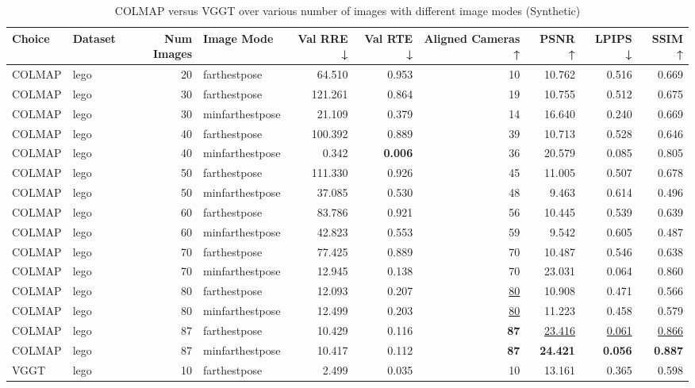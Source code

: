 \begin{table}[H]
\caption{\ifdefined\customcaption \customcaption \else COLMAP versus VGGT over various number of images with different image modes (Synthetic) \fi}
\label{tab:01_num_images_image_mode_synthetic}
\centering
\scriptsize
\begin{tabular}{llrlrrrrrr}
\toprule
Choice & Dataset & Num Images & Image Mode & Val RRE ↓ & Val RTE ↓ & Aligned Cameras ↑ & PSNR ↑ & LPIPS ↓ & SSIM ↑ \\
\midrule
COLMAP & lego & 20 & farthestpose & 64.510 & 0.953 & 10 & 10.762 & 0.516 & 0.669 \\
COLMAP & lego & 30 & farthestpose & 121.261 & 0.864 & 19 & 10.755 & 0.512 & 0.675 \\
COLMAP & lego & 30 & minfarthestpose & 21.109 & 0.379 & 14 & 16.640 & 0.240 & 0.669 \\
COLMAP & lego & 40 & farthestpose & 100.392 & 0.889 & 39 & 10.713 & 0.528 & 0.646 \\
COLMAP & lego & 40 & minfarthestpose & 0.342 & \textbf{0.006} & 36 & 20.579 & 0.085 & 0.805 \\
COLMAP & lego & 50 & farthestpose & 111.330 & 0.926 & 45 & 11.005 & 0.507 & 0.678 \\
COLMAP & lego & 50 & minfarthestpose & 37.085 & 0.530 & 48 & 9.463 & 0.614 & 0.496 \\
COLMAP & lego & 60 & farthestpose & 83.786 & 0.921 & 56 & 10.445 & 0.539 & 0.639 \\
COLMAP & lego & 60 & minfarthestpose & 42.823 & 0.553 & 59 & 9.542 & 0.605 & 0.487 \\
COLMAP & lego & 70 & farthestpose & 77.425 & 0.889 & 70 & 10.487 & 0.546 & 0.638 \\
COLMAP & lego & 70 & minfarthestpose & 12.945 & 0.138 & 70 & 23.031 & 0.064 & 0.860 \\
COLMAP & lego & 80 & farthestpose & 12.093 & 0.207 & \underline{80} & 10.908 & 0.471 & 0.566 \\
COLMAP & lego & 80 & minfarthestpose & 12.499 & 0.203 & \underline{80} & 11.223 & 0.458 & 0.579 \\
COLMAP & lego & 87 & farthestpose & 10.429 & 0.116 & \textbf{87} & \underline{23.416} & \underline{0.061} & \underline{0.866} \\
COLMAP & lego & 87 & minfarthestpose & 10.417 & 0.112 & \textbf{87} & \textbf{24.421} & \textbf{0.056} & \textbf{0.887} \\
VGGT & lego & 10 & farthestpose & 2.499 & 0.035 & 10 & 13.161 & 0.365 & 0.598 \\

\end{tabular}
\end{table}
